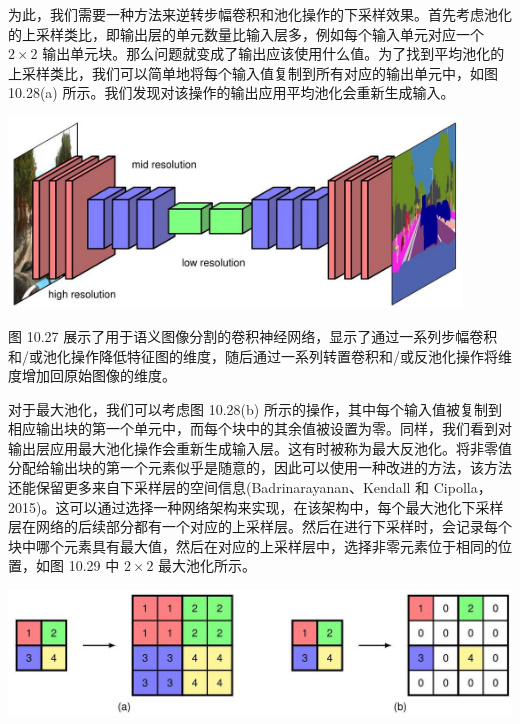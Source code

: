 \documentclass[10pt]{report}
\begin{document}
为此，我们需要一种方法来逆转步幅卷积和池化操作的下采样效果。首先考虑池化的上采样类比，即输出层的单元数量比输入层多，例如每个输入单元对应一个 \(2 \times  2\) 输出单元块。那么问题就变成了输出应该使用什么值。为了找到平均池化的上采样类比，我们可以简单地将每个输入值复制到所有对应的输出单元中，如图 10.28(a) 所示。我们发现对该操作的输出应用平均池化会重新生成输入。

\begin{center}
\includegraphics[max width=0.9\textwidth]{images/0194e279-9b28-703a-88f4-c3ac21e2010d_336_331_342_1186_501_0.jpg}
\end{center}
\hspace*{3em} 

图 10.27 展示了用于语义图像分割的卷积神经网络，显示了通过一系列步幅卷积和/或池化操作降低特征图的维度，随后通过一系列转置卷积和/或反池化操作将维度增加回原始图像的维度。

对于最大池化，我们可以考虑图 10.28(b) 所示的操作，其中每个输入值被复制到相应输出块的第一个单元中，而每个块中的其余值被设置为零。同样，我们看到对输出层应用最大池化操作会重新生成输入层。这有时被称为最大反池化。将非零值分配给输出块的第一个元素似乎是随意的，因此可以使用一种改进的方法，该方法还能保留更多来自下采样层的空间信息(Badrinarayanan、Kendall 和 Cipolla，2015)。这可以通过选择一种网络架构来实现，在该架构中，每个最大池化下采样层在网络的后续部分都有一个对应的上采样层。然后在进行下采样时，会记录每个块中哪个元素具有最大值，然后在对应的上采样层中，选择非零元素位于相同的位置，如图 10.29 中 \(2 \times  2\) 最大池化所示。

\begin{center}
\includegraphics[max width=1.0\textwidth]{images/0194e279-9b28-703a-88f4-c3ac21e2010d_336_235_1601_1304_326_0.jpg}
\end{center}
\hspace*{3em} 
\end{document}
